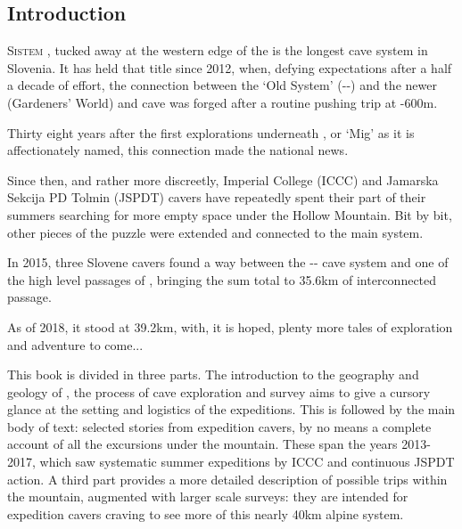 \begin{tcolorbox} %
\vspace{60pt}
	\part{Introduction}
	\lettrine{S}{istem} , tucked away at the western edge of the  is the longest cave system in Slovenia.  It has held that title since 2012, when, defying expectations after a half a decade of effort, the connection between the `Old System' (--) and the newer  (Gardeners' World) and  cave was forged after a routine pushing trip at -600m.

Thirty eight years after the first explorations underneath , or `Mig' as it is affectionately named, this connection made the national news. 

Since then, and rather more discreetly, Imperial College (ICCC) and Jamarska Sekcija PD Tolmin (JSPDT) cavers have repeatedly spent their part of their summers searching for more empty space under the Hollow Mountain. Bit by bit, other pieces of the puzzle were extended and connected to the main system.

In 2015, three Slovene cavers found a way between the -- cave system and one of the high level passages of , bringing the sum total to 35.6km of interconnected passage. 

As of 2018, it stood at 39.2km, with, it is hoped, plenty more tales of exploration and adventure to come...

\mydelimiter

This book is divided in three parts. The introduction to the geography and geology of , the process of cave exploration and survey aims to give a cursory glance at the setting and logistics of the expeditions. This is followed by the main body of text: selected stories from expedition cavers, by no means a complete account of all the excursions under the mountain. These span the years 2013-2017, which saw systematic summer expeditions by ICCC and continuous JSPDT action. A third part provides a more detailed description of possible trips within the mountain, augmented with larger scale surveys: they are intended for expedition cavers craving to see more of this nearly 40km alpine system. 
\end{tcolorbox}
